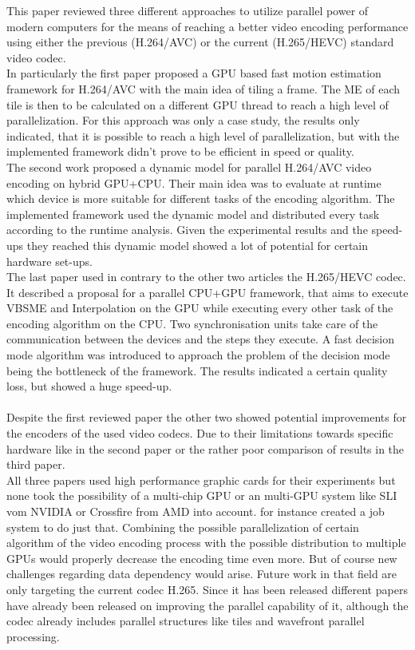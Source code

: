 This paper reviewed three different approaches to utilize parallel power of modern computers for the means of reaching a better video encoding performance using either the previous (H.264/AVC) or the current (H.265/HEVC) standard video codec. \\
In particularly the first paper \cite{Paper1} proposed a GPU based fast motion estimation framework for H.264/AVC with the main idea of tiling a frame. The ME of each tile is then to be calculated on a different GPU thread to reach a high level of parallelization. For this approach was only a case study, the results only indicated, that it is possible to reach a high level of parallelization, but with the implemented framework didn't prove to be efficient in speed or quality.\\
The second work \cite{Paper2} proposed a dynamic model for parallel H.264/AVC video encoding on hybrid GPU+CPU. Their main idea was to evaluate at runtime which device is more suitable for different tasks of the encoding algorithm. The implemented framework used the dynamic model and distributed every task according to the runtime analysis. Given the experimental results and the speed-ups they reached this dynamic model showed a lot of potential for certain hardware set-ups.\\
The last paper \cite{Paper3} used in contrary to the other two articles the H.265/HEVC codec. It described a proposal for a parallel CPU+GPU framework, that aims to execute VBSME and Interpolation on the GPU while executing every other task of the encoding algorithm on the CPU. Two synchronisation units take care of the communication between the devices and the steps they execute. A fast decision mode algorithm was introduced to approach the problem of the decision mode being the bottleneck of the framework. The results indicated a certain quality loss, but showed a huge speed-up.\\
\\
Despite the first reviewed paper the other two showed potential improvements for the encoders of the used video codecs. Due to their limitations towards specific hardware like in the second paper or the rather poor comparison of results in the third paper. \\
All three papers used high performance graphic cards for their experiments but none took the possibility of a multi-chip GPU or an multi-GPU system like SLI vom NVIDIA or Crossfire from AMD into account. \cite{multigpu} for instance created a job system to do just that. Combining the possible parallelization of certain algorithm of the video encoding process with the possible distribution to multiple GPUs would properly decrease the encoding time even more. But of course new challenges regarding data dependency would arise. Future work in that field are only targeting the current codec H.265. Since it has been released different papers have already been released on improving the parallel capability of it, although the codec already includes parallel structures like tiles and wavefront parallel processing.